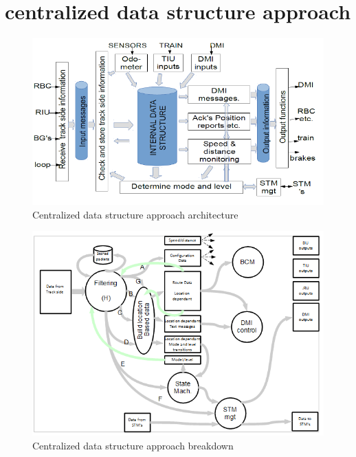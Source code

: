 \documentclass{template/openetcs_report}
\begin{document}
 \newpage
 \chapter{centralized data structure approach}
 \begin{figure}[hbtp]
\centering
\includegraphics [scale=0.6] {images/CentralizedDataStrukture_2}
\caption{Centralized data structure approach architecture}
\end{figure}


 \begin{figure}[hbtp]
\centering
\includegraphics [scale=0.7] {images/CentralizedDataStructure_1}
\caption{Centralized data structure approach breakdown}
\end{figure}

\newpage
\end{document}
